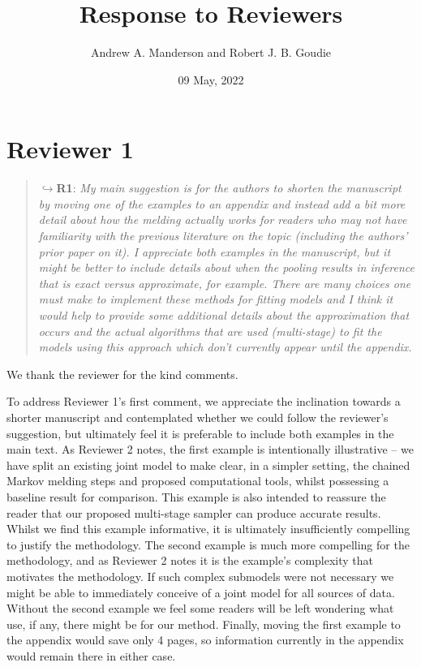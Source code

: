 \documentclass[
  10pt,
  a4paper,
]{article}
\title{Response to Reviewers}
\author{Andrew A. Manderson and Robert J. B. Goudie}
\date{09 May, 2022}
\begin{document}
\maketitle

\hypertarget{reviewer-1}{%
\section*{Reviewer 1}\label{reviewer-1}}

\begin{quote}
\(\hookrightarrow\)\textbf{R1}: \emph{My main suggestion is for the
authors to shorten the manuscript by moving one of the examples to an
appendix and instead add a bit more detail about how the melding
actually works for readers who may not have familiarity with the
previous literature on the topic (including the authors' prior paper on
it). I appreciate both examples in the manuscript, but it might be
better to include details about when the pooling results in inference
that is exact versus approximate, for example. There are many choices
one must make to implement these methods for fitting models and I think
it would help to provide some additional details about the approximation
that occurs and the actual algorithms that are used (multi-stage) to fit
the models using this approach which don't currently appear until the
appendix.}
\end{quote}

We thank the reviewer for the kind comments.

To address Reviewer 1's first comment, we appreciate the inclination
towards a shorter manuscript and contemplated whether we could follow
the reviewer's suggestion, but ultimately feel it is preferable to
include both examples in the main text. As Reviewer 2 notes, the first
example is intentionally illustrative -- we have split an existing joint
model to make clear, in a simpler setting, the chained Markov melding
steps and proposed computational tools, whilst possessing a baseline
result for comparison. This example is also intended to reassure the
reader that our proposed multi-stage sampler can produce accurate
results. Whilst we find this example informative, it is ultimately
insufficiently compelling to justify the methodology. The second example
is much more compelling for the methodology, and as Reviewer 2 notes it
is the example's complexity that motivates the methodology. If such
complex submodels were not necessary we might be able to immediately
conceive of a joint model for all sources of data. Without the second
example we feel some readers will be left wondering what use, if any,
there might be for our method. Finally, moving the first example to the
appendix would save only 4 pages, so information currently in the
appendix would remain there in either case.
\end{document}

